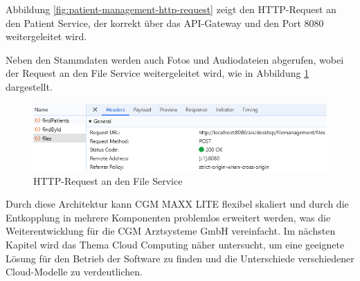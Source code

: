     Abbildung \ref{fig:patient-management-http-request} zeigt den HTTP-Request an den Patient Service, der korrekt über das API-Gateway und den Port 8080 weitergeleitet wird.

    Neben den Stammdaten werden auch Fotos und Audiodateien abgerufen, wobei der Request an den File Service weitergeleitet wird, wie in Abbildung \ref{fig:file-management-http-request} dargestellt.

    \begin{figure}[H]
        \centering
        \includegraphics[width=1\linewidth]{images/EA/file-management-http-request.png}
        \caption{HTTP-Request an den File Service}
        \label{fig:file-management-http-request}
    \end{figure}

    Durch diese Architektur kann CGM MAXX LITE flexibel skaliert und durch die Entkopplung in mehrere Komponenten problemlos erweitert werden, was die Weiterentwicklung für die CGM Arztsysteme GmbH vereinfacht. 
    Im nächsten Kapitel wird das Thema Cloud Computing näher untersucht, um eine geeignete Lösung für den Betrieb der Software zu finden und die Unterschiede verschiedener Cloud-Modelle zu verdeutlichen. 
    
